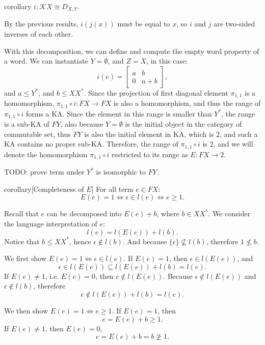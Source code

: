 \documentclass[a4paper,UKenglish,cleveref, autoref, thm-restate]{lipics-v2021}
\begin{document}
\begin{theoremEnd}{corollary}
  $i : \mathcal{K}X  \cong  D_{X,Y}$.
\end{theoremEnd}

\begin{proofEnd}
  By the previous results, $i(j(x))$ must be equal to $x$, so $i$ and $j$ are
  two-sided inverses of each other.
\end{proofEnd}

With this decomposition, we can define and compute the empty word property of a word.
We can instantiate \(Y =  \emptyset \), and \(Z = X\), in this case:
\[i(e) = \begin{bmatrix}
  a & b \\
  0 & a + b
\end{bmatrix},\]
and \(a  \leq  Y^*\), and \(b  \leq  X X^*\).
Since the projection of first diagonal element \( \pi _{1, 1}\) is a homomorphism,
\( \pi _{1, 1}  \circ  i: F X  \to  F X\) is also a homomorphism,
and thus the range of \( \pi _{1, 1}  \circ  i\) forms a KA.
Since the element in this range is smaller than \(Y^*\),
the range is a sub-KA of \(F Y\),
also because \(Y =  \emptyset \) is the initial object in the category of commutable set,
thus \(F Y\) is also the initial element in KA, which is \(2\),
and such a KA contains no proper sub-KA.
Therefore, the range of \( \pi _{1, 1}  \circ  i\) is \(2\),
and we will denote the homomorphism \( \pi _{1,1}  \circ  i\)
restricted to its range as \(E: F X  \to  2\).

TODO: prove term under \(Y^*\) is isomorphic to \(F Y\).

\begin{theoremEnd}{corollary}[Completeness of \(E\)]
  For all term \(e  \in  F X\):
  \[E(e) = 1  \iff   \epsilon   \in  l(e)  \iff  e  \geq  1.\]
\end{theoremEnd}

\begin{proofEnd}
  Recall that \(e\) can be decomposed into \(E(e) + b\), where \(b  \in  X X^*\).
  We consider the language interpretation of \(e\):
  \[l(e) = l(E(e)) + l(b).\]
  Notice that \(b  \leq  X X^*\), hence \( \epsilon   \notin  l(b)\).
  And because \(\{ \epsilon \}  \nsubseteq  l(b)\), therefore \(1  \nleq  b\).

  We first show \(E(e) = 1  \iff   \epsilon   \in  l(e)\).
  If \(E(e) = 1\), then \( \epsilon   \in  l(E(e))\), and
  \[ \epsilon   \in  l(E(e))  \subseteq  l(E(e)) + l(b) = l(e).\]
  If \(E(e)  \neq  1\), i.e. \(E(e) = 0\), then \( \epsilon   \notin  l(E(e))\).
  Because \( \epsilon   \notin  l(E(e))\) and \( \epsilon   \notin  l(b)\), therefore
  \[ \epsilon   \notin  l(E(e)) + l(b) = l(e).\]

  We then show \(E(e) = 1  \iff  e  \geq  1\).
  If \(E(e) = 1\), then
  \[e = E(e) + b  \geq  1.\]
  If \(E(e)  \neq  1\), then \(E(e) = 0\),
  \[e = E(e) + b = b  \ngeq  1.\]
\end{proofEnd}
\end{document}
